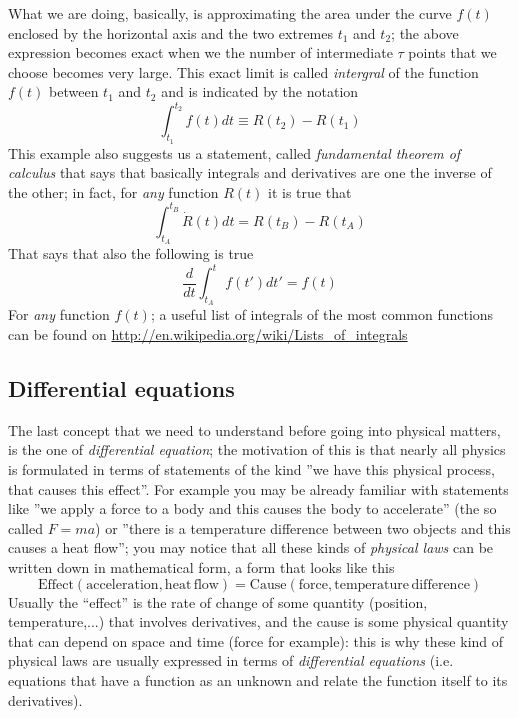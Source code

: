 What we are doing, basically, is approximating the area under the curve $f(t)$ enclosed by the horizontal axis and the two extremes $t_1$ and $t_2$; the above expression becomes exact when we the number of intermediate $\tau$ points that we choose becomes very large. This exact limit is called \textit{intergral} of the function $f(t)$ between $t_1$ and $t_2$ and is indicated by the notation
\begin{equation}
\int_{t_1}^{t_2}f(t)dt\equiv R(t_2)-R(t_1)
\end{equation}
This example also suggests us a statement, called \textit{fundamental theorem of calculus} that says that basically integrals and derivatives are one the inverse of the other; in fact, for \textit{any} function $R(t)$ it is true that
\begin{equation}
\int_{t_A}^{t_B}\dot{R}(t)dt=R(t_B)-R(t_A)
\end{equation}
That says that also the following is true
\begin{equation}
\frac{d}{dt}\int_{t_A}^t f(t')dt'=f(t)
\end{equation}
For \textit{any} function $f(t)$; a useful list of integrals of the most common functions can be found on \url{http://en.wikipedia.org/wiki/Lists_of_integrals}
\subsection{Differential equations}
The last concept that we need to understand before going into physical matters, is the one of \textit{differential equation}; the motivation of this is that nearly all physics is formulated in terms of statements of the kind ''we have this physical process, that causes this effect''. For example you may be already familiar with statements like ''we apply a force to a body and this causes the body to accelerate'' (the so called $F=ma$) or ''there is a temperature difference between two objects and this causes a heat flow''; you may notice that all these kinds of \textit{physical laws} can be written down in mathematical form, a form that looks like this 
\begin{equation}
\label{concept}
\mathrm{Effect(acceleration,heat \,flow)}=\mathrm{Cause(force,temperature \,difference)}
\end{equation} 
Usually the ``effect'' is the rate of change of some quantity (position, temperature,...) that involves derivatives, and the cause is some physical quantity that can depend on space and time (force for example): this is why these kind of physical laws are usually expressed in terms of \textit{differential equations} (i.e. equations that have a function as an unknown and relate the function itself to its derivatives). 
